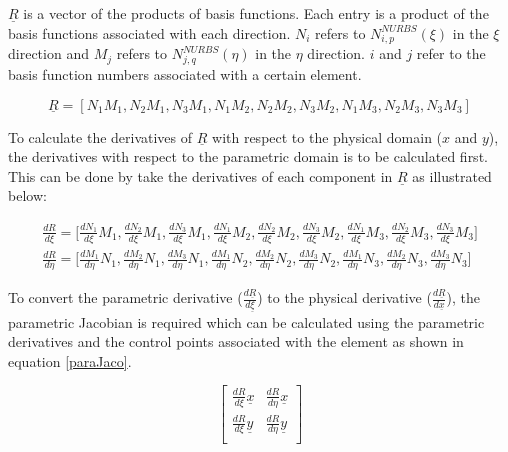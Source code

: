 \documentclass[a4paper]{report}
\begin{document}
	\noindent $\underline{R}$ is a vector of the products of basis functions. Each entry is a product of the basis functions associated with each direction. $N_i$ refers to $N^{NURBS}_{i,p}(\xi)$ in the $\xi$ direction and $M_j$ refers to $N^{NURBS}_{j,q}(\eta)$ in the $\eta$ direction. $i$ and $j$ refer to the basis function numbers associated with a certain element.
	
	\begin{equation}
		\underline{R}=[N_1M_1,N_2M_1,N_3M_1,N_1M_2,N_2M_2,N_3M_2,N_1M_3,N_2M_3,N_3M_3]
	\end{equation}
	
	\noindent To calculate the derivatives of $\underline{R}$ with respect to the physical domain ($x$ and $y$), the derivatives with respect to the parametric domain is to be calculated first. This can be done by take the derivatives of each component in $\underline{R}$ as illustrated below:
	
	\begin{eqnarray}
		\frac{dR}{d\xi} =\Bigg[\frac{dN_1}{d\xi}M_1, \frac{dN_2}{d\xi}M_1, \frac{dN_3}{d\xi}M_1, \frac{dN_1}{d\xi}M_2, \frac{dN_2}{d\xi}M_2, \frac{dN_3}{d\xi}M_2, \frac{dN_1}{d\xi}M_3, \frac{dN_2}{d\xi}M_3, \frac{dN_3}{d\xi}M_3 \Bigg] \\
		\frac{dR}{d\eta} =\Bigg[\frac{dM_1}{d\eta}N_1, \frac{dM_2}{d\eta}N_1, \frac{dM_3}{d\eta}N_1, \frac{dM_1}{d\eta}N_2, \frac{dM_2}{d\eta}N_2, \frac{dM_3}{d\eta}N_2, \frac{dM_1}{d\eta}N_3, \frac{dM_2}{d\eta}N_3, \frac{dM_3}{d\eta}N_3 \Bigg]
	\end{eqnarray}
	
	\noindent To convert the parametric derivative ($\frac{d\underline{R}}{d\underline{\xi}}$) to the physical derivative ($\frac{d\underline{R}}{d\underline{x}}$), the parametric Jacobian is required which can be calculated using the parametric derivatives and the control points associated with the element as shown in equation \ref{paraJaco}.
	
	\begin{equation}
		\begin{bmatrix}
		\frac{dR}{d\xi} \underline{x} & \frac{dR}{d\eta} \underline{x} \\
		\frac{dR}{d\xi} \underline{y} & \frac{dR}{d\eta} \underline{y} \\
		\end{bmatrix}
		\label{paraJaco}
	\end{equation}
\end{document}
